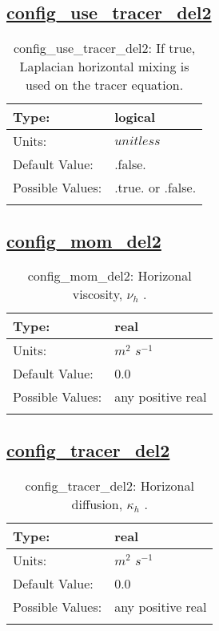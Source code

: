 \subsection[config\_use\_tracer\_del2]{\hyperref[sec:nm_tab_hmix_del2]{config\_use\_tracer\_del2}}
\label{subsec:nm_sec_config_use_tracer_del2}
\begin{center}
\begin{longtable}{| p{2.0in} | p{4.0in} |}
    \hline
    Type: & logical \\
    \hline
    Units: & $unitless$ \\
    \hline
    Default Value: & .false. \\
    \hline
    Possible Values: & .true. or .false. \\
    \hline
    \caption{config\_use\_tracer\_del2: If true, Laplacian horizontal mixing is used on the tracer equation.}
\end{longtable}
\end{center}
\subsection[config\_mom\_del2]{\hyperref[sec:nm_tab_hmix_del2]{config\_mom\_del2}}
\label{subsec:nm_sec_config_mom_del2}
\begin{center}
\begin{longtable}{| p{2.0in} | p{4.0in} |}
    \hline
    Type: & real \\
    \hline
    Units: & $m^2$ $s^{-1}$ \\
    \hline
    Default Value: & 0.0 \\
    \hline
    Possible Values: & any positive real \\
    \hline
    \caption{config\_mom\_del2:  Horizonal viscosity,  $\nu_h$ .}
\end{longtable}
\end{center}
\subsection[config\_tracer\_del2]{\hyperref[sec:nm_tab_hmix_del2]{config\_tracer\_del2}}
\label{subsec:nm_sec_config_tracer_del2}
\begin{center}
\begin{longtable}{| p{2.0in} | p{4.0in} |}
    \hline
    Type: & real \\
    \hline
    Units: & $m^2$ $s^{-1}$ \\
    \hline
    Default Value: & 0.0 \\
    \hline
    Possible Values: & any positive real \\
    \hline
    \caption{config\_tracer\_del2:  Horizonal diffusion,  $\kappa_h$ .}
\end{longtable}
\end{center}
